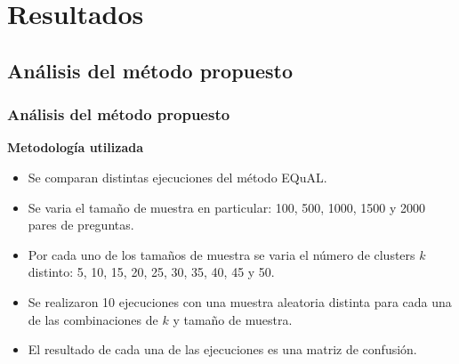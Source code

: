 \section{Resultados}

\subsection{Análisis del método propuesto}
\begin{frame}
	\frametitle{Análisis del método propuesto}

	\textbf{Metodología utilizada}
	\bigskip

	\begin{itemize}[<*>]
		\item Se comparan distintas ejecuciones del método EQuAL.
		\item Se varia el tamaño de muestra en particular: 100, 500, 1000, 1500 y 2000 pares de preguntas.
		\item Por cada uno de los tamaños de muestra se varia el número de clusters \(k\) distinto: 5, 10, 15, 20, 25, 30, 35, 40, 45 y 50.
		\item Se realizaron 10 ejecuciones con una muestra aleatoria distinta para cada una de las combinaciones de \(k\) y tamaño de muestra.
		\item El resultado de cada una de las ejecuciones es una matriz de confusión.
	\end{itemize}

	\framebreak


\end{frame}
